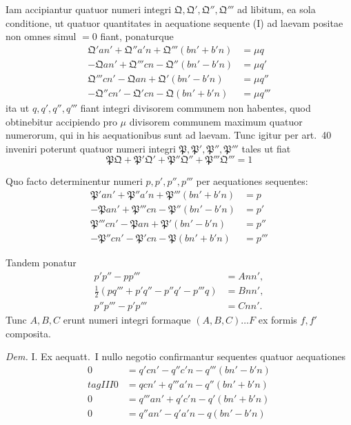 \documentclass[12pt,a4paper]{article}
\theoremstyle{plain}
\theoremstyle{definition}
\theoremstyle{remark}
\begin{document}
Iam accipiantur quatuor numeri integri $\mathfrak{Q}, \mathfrak{Q}', \mathfrak{Q}'', \mathfrak{Q}'''$ ad libitum, ea sola conditione, ut quatuor quantitates in aequatione sequente (I) ad laevam positae non omnes simul $= 0$ fiant, ponaturque
\begin{align*}
\mathfrak{Q}'an' + \mathfrak{Q}''a'n + \mathfrak{Q}'''(bn' + b'n) &= \mu q \\
-\mathfrak{Q}an' + \mathfrak{Q}'''cn - \mathfrak{Q}''(bn' - b'n) &= \mu q' \\
\mathfrak{Q}'''cn' - \mathfrak{Q}an + \mathfrak{Q}'(bn' - b'n) &= \mu q'' \\
-\mathfrak{Q}''cn' - \mathfrak{Q}'cn - \mathfrak{Q}(bn' + b'n) &= \mu q'''
\end{align*}
ita ut $q, q', q'', q'''$ fiant integri divisorem communem non habentes, quod obtinebitur accipiendo pro $\mu$ divisorem communem maximum quatuor numerorum, qui in his aequationibus sunt ad laevam. Tunc igitur per art.\ 40 inveniri poterunt quatuor numeri integri $\mathfrak{P}, \mathfrak{P}', \mathfrak{P}'', \mathfrak{P}'''$ tales ut fiat
\[
\mathfrak{P}\mathfrak{Q} + \mathfrak{P}'\mathfrak{Q}' + \mathfrak{P}''\mathfrak{Q}'' + \mathfrak{P}'''\mathfrak{Q}''' = 1
\]

Quo facto determinentur numeri $p, p', p'', p'''$ per aequationes sequentes:
\begin{align*}
\mathfrak{P}'an' + \mathfrak{P}''a'n + \mathfrak{P}'''(bn' + b'n) &= p \\
-\mathfrak{P}an' + \mathfrak{P}'''cn - \mathfrak{P}''(bn' - b'n) &= p' \\
\mathfrak{P}'''cn' - \mathfrak{P}an + \mathfrak{P}'(bn' - b'n) &= p'' \\
-\mathfrak{P}''cn' - \mathfrak{P}'cn - \mathfrak{P}(bn' + b'n) &= p'''
\end{align*}

Tandem ponatur
\begin{align*}
p'p'' - pp''' &= Ann', \\
\tfrac{1}{2}(pq''' + p'q'' - p''q' - p'''q) &= Bnn', \\
p''p''' - p'p''' &= Cnn'.
\end{align*}
Tunc $A, B, C$ erunt numeri integri formaque $(A,B,C) \ldots F$ ex formis $f, f'$ composita.

\textit{Dem.} I. Ex aequatt.\ I nullo negotio confirmantur sequentes quatuor aequationes
\begin{align*}
0 &= q'cn' - q''c'n - q'''(bn' - b'n) \\tag{III}
0 &= qcn' + q'''a'n - q''(bn' + b'n) \\
0 &= q'''an' + q'c'n - q'(bn' + b'n) \\
0 &= q''an' - q'a'n - q(bn' - b'n)
\end{align*}
\end{document}
